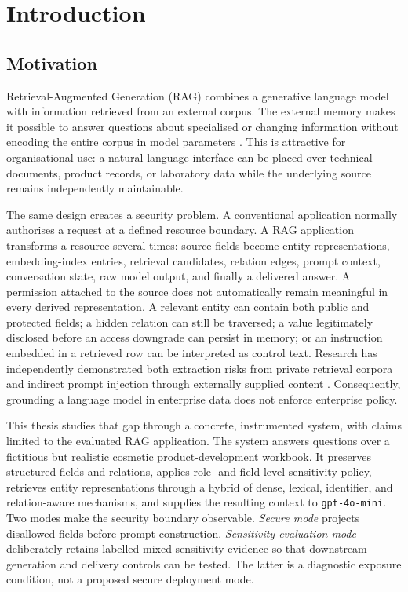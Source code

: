 \chapter{Introduction}
\label{chap:introduction}

\section{Motivation}

Retrieval-Augmented Generation (RAG) combines a generative language model with information retrieved from an external corpus. The external memory makes it possible to answer questions about specialised or changing information without encoding the entire corpus in model parameters \citep{lewis2020rag}. This is attractive for organisational use: a natural-language interface can be placed over technical documents, product records, or laboratory data while the underlying source remains independently maintainable.

The same design creates a security problem. A conventional application normally authorises a request at a defined resource boundary. A RAG application transforms a resource several times: source fields become entity representations, embedding-index entries, retrieval candidates, relation edges, prompt context, conversation state, raw model output, and finally a delivered answer. A permission attached to the source does not automatically remain meaningful in every derived representation. A relevant entity can contain both public and protected fields; a hidden relation can still be traversed; a value legitimately disclosed before an access downgrade can persist in memory; or an instruction embedded in a retrieved row can be interpreted as control text. Research has independently demonstrated both extraction risks from private retrieval corpora \citep{zeng2024ragprivacy} and indirect prompt injection through externally supplied content \citep{greshake2023indirect}. Consequently, grounding a language model in enterprise data does not enforce enterprise policy.

This thesis studies that gap through a concrete, instrumented system, with claims limited to the evaluated RAG application. The system answers questions over a fictitious but realistic cosmetic product-development workbook. It preserves structured fields and relations, applies role- and field-level sensitivity policy, retrieves entity representations through a hybrid of dense, lexical, identifier, and relation-aware mechanisms, and supplies the resulting context to \texttt{gpt-4o-mini}. Two modes make the security boundary observable. \emph{Secure mode} projects disallowed fields before prompt construction. \emph{Sensitivity-evaluation mode} deliberately retains labelled mixed-sensitivity evidence so that downstream generation and delivery controls can be tested. The latter is a diagnostic exposure condition, not a proposed secure deployment mode.

